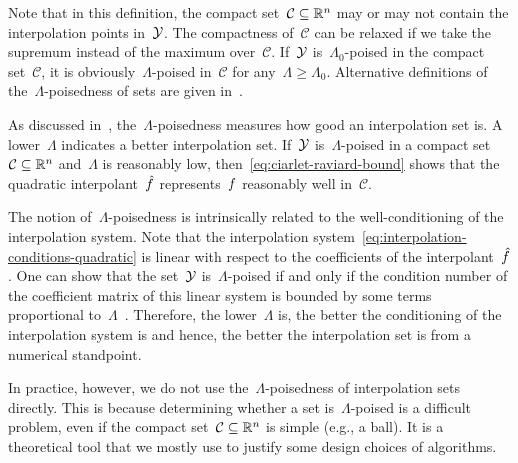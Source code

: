 Note that in this definition, the compact set~$\mathcal{C} \subseteq \mathbb{R}^n$ may or may not contain the interpolation points in~$\xpt$.
The compactness of~$\mathcal{C}$ can be relaxed if we take the supremum instead of the maximum over~$\mathcal{C}$. 
If~$\xpt$ is~$\Lambda_0$-poised in the compact set~$\mathcal{C}$, it is obviously~$\Lambda$-poised in~$\mathcal{C}$ for any~$\Lambda \ge \Lambda_0$.
Alternative definitions of the~$\Lambda$-poisedness of sets are given in~\cite[\S~3.3]{Conn_Scheinberg_Vicente_2009b}.

As discussed in~\cite[\S~3.3]{Conn_Scheinberg_Vicente_2009b}, the~$\Lambda$-poisedness measures how good an interpolation set is.
A lower~$\Lambda$ indicates a better interpolation set.
If~$\xpt$ is~$\Lambda$-poised in a compact set~$\mathcal{C} \subseteq \mathbb{R}^n$ and~$\Lambda$ is reasonably low, then~\cref{eq:ciarlet-raviard-bound} shows that the quadratic interpolant~$\objm$ represents~$f$ reasonably well in~$\mathcal{C}$.

The notion of~$\Lambda$-poisedness is intrinsically related to the well-conditioning of the interpolation system.
Note that the interpolation system~\cref{eq:interpolation-conditions-quadratic} is linear with respect to the coefficients of the interpolant~$\objm$.
One can show that the set~$\xpt$ is~$\Lambda$-poised if and only if the condition number of the coefficient matrix of this linear system is bounded by some terms proportional to~$\Lambda$~\cite[thm.~3.14]{Conn_Scheinberg_Vicente_2009b}.
Therefore, the lower~$\Lambda$ is, the better the conditioning of the interpolation system is and hence, the better the interpolation set is from a numerical standpoint.

In practice, however, we do not use the~$\Lambda$-poisedness of interpolation sets directly.
This is because determining whether a set is~$\Lambda$-poised is a difficult problem, even if the compact set~$\mathcal{C} \subseteq \mathbb{R}^n$ is simple (e.g., a ball).
It is a theoretical tool that we mostly use to justify some design choices of algorithms.




